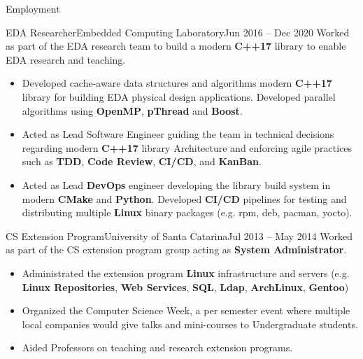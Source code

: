 \documentclass[calibri]{mcdowellcv}
\begin{document}
\begin{cvsection}{Employment}
		\begin{cvsubsection}{EDA Researcher}{Embedded Computing Laboratory}{Jun 2016 -- Dec 2020}
			Worked as part of the EDA research team to build a modern \textbf{C++17} library to enable EDA research and teaching.
			\begin{itemize}
				\item Developed cache-aware data structures and algorithms modern \textbf{C++17} library for building EDA physical design applications. Developed parallel algorithms using \textbf{OpenMP}, \textbf{pThread} and \textbf{Boost}.
				\item Acted as Lead Software Engineer guiding the team in technical decisions regarding modern \textbf{C++17} library Architecture and enforcing agile practices such as \textbf{TDD}, \textbf{Code Review}, \textbf{CI/CD}, and \textbf{KanBan}.
				\item Acted as Lead \textbf{DevOps} engineer developing the library build system in modern \textbf{CMake} and \textbf{Python}. Developed \textbf{CI/CD} pipelines for testing and distributing multiple \textbf{Linux} binary packages (e.g. rpm, deb, pacman, yocto).
			\end{itemize}
		\end{cvsubsection}

		\begin{cvsubsection}{CS Extension Program}{University of Santa Catarina}{Jul 2013 -- May 2014}
			Worked as part of the CS extension program group acting as \textbf{System Administrator}.
			\begin{itemize}
				\item Administrated the extension program \textbf{Linux} infrastructure and servers (e.g. \textbf{Linux Repositories}, \textbf{Web Services}, \textbf{SQL}, \textbf{Ldap}, \textbf{ArchLinux}, \textbf{Gentoo})
				\item Organized the Computer Science Week, a per semester event where multiple local companies would give talks and mini-courses to Undergraduate students.
				\item Aided Professors on teaching and research extension programs.
			\end{itemize}
		\end{cvsubsection}
	\end{cvsection}
\end{document}
